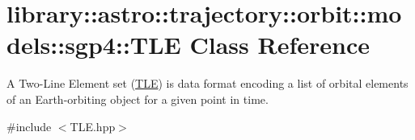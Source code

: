 \hypertarget{classlibrary_1_1astro_1_1trajectory_1_1orbit_1_1models_1_1sgp4_1_1_t_l_e}{}\section{library\+:\+:astro\+:\+:trajectory\+:\+:orbit\+:\+:models\+:\+:sgp4\+:\+:T\+LE Class Reference}
\label{classlibrary_1_1astro_1_1trajectory_1_1orbit_1_1models_1_1sgp4_1_1_t_l_e}


A Two-\/\+Line Element set (\hyperlink{classlibrary_1_1astro_1_1trajectory_1_1orbit_1_1models_1_1sgp4_1_1_t_l_e}{T\+LE}) is data format encoding a list of orbital elements of an Earth-\/orbiting object for a given point in time.  




{\ttfamily \#include $<$T\+L\+E.\+hpp$>$}

